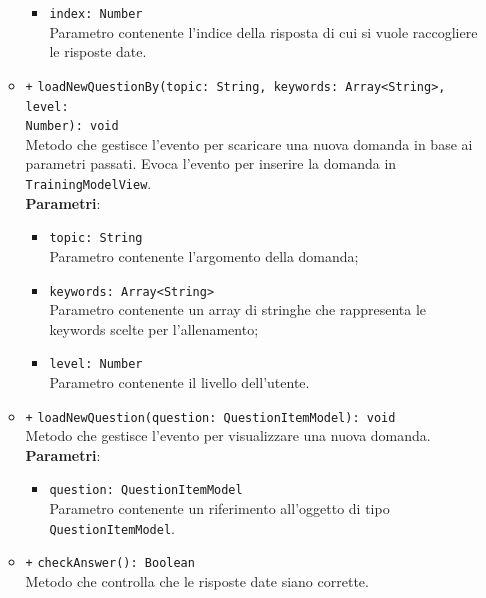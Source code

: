 \begin{itemize}
\begin{itemize}
		\begin{itemize}
			\item \texttt{index: Number} \\
			Parametro contenente l'indice della risposta di cui si vuole raccogliere le risposte date. 
		\end{itemize}
		\item \texttt{+} \texttt{loadNewQuestionBy(topic: String, keywords: Array<String>, level:\\ Number): void} \\
		Metodo che gestisce l'evento per scaricare una nuova domanda in base ai parametri passati. Evoca l'evento per inserire la domanda in \texttt{TrainingModelView}. \\
		\textbf{Parametri}:
		\begin{itemize}
			\item \texttt{topic: String} \\
			Parametro contenente l'argomento della domanda;
			\item \texttt{keywords: Array<String>} \\
			Parametro contenente un array di stringhe che rappresenta le keywords scelte per l'allenamento;
			\item \texttt{level: Number} \\
			Parametro contenente il livello dell'utente.
		\end{itemize}
		\item \texttt{+} \texttt{loadNewQuestion(question: QuestionItemModel): void} \\
		Metodo che gestisce l'evento per visualizzare una nuova domanda. \\
		\textbf{Parametri}:
		\begin{itemize}
			\item \texttt{question: QuestionItemModel} \\
			Parametro contenente un riferimento all'oggetto di tipo \texttt{QuestionItemModel}.
		\end{itemize}
		\item \texttt{+} \texttt{checkAnswer(): Boolean} \\ 
		Metodo che controlla che le risposte date siano corrette.
	\end{itemize}
\end{itemize}

